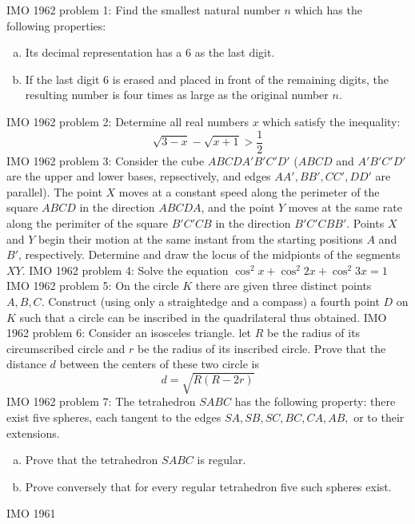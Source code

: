 IMO 1962 problem 1:  Find the smallest natural number $n$ which has the following properties:
\begin{enumerate}[a)]
  \item Its decimal representation has a 6 as the last digit.
  \item If the last digit 6 is erased and placed in front of the remaining digits, the resulting number is four times as large as the original number $n$.
\end{enumerate} 
IMO 1962 problem 2:  Determine all real numbers $x$ which satisfy the inequality:
\[ \sqrt{3-x}-\sqrt{x+1}>\dfrac{1}{2} \] 
IMO 1962 problem 3:  Consider the cube $ABCDA'B'C'D'$ ($ABCD$ and $A'B'C'D'$ are the upper and lower bases, repsectively, and edges $AA', BB', CC', DD'$ are parallel). The point $X$ moves at a constant speed along the perimeter of the square $ABCD$ in the direction $ABCDA$, and the point $Y$ moves at the same rate along the perimiter of the square $B'C'CB$ in the direction $B'C'CBB'$. Points $X$ and $Y$ begin their motion at the same instant from the starting positions $A$ and $B'$, respectively. Determine and draw the locus of the midpionts of the segments $XY$. 
IMO 1962 problem 4:  Solve the equation $\cos^2{x}+\cos^2{2x}+\cos^2{3x}=1$ 
IMO 1962 problem 5:  On the circle $K$ there are given three distinct points $A,B,C$. Construct (using only a straightedge and a compass) a fourth point $D$ on $K$ such that a circle can be inscribed in the quadrilateral thus obtained. 
IMO 1962 problem 6:  Consider an isosceles triangle. let $R$ be the radius of its circumscribed circle and $r$ be the radius of its inscribed circle. Prove that the distance $d$ between the centers of these two circle is
\[ d=\sqrt{R(R-2r)} \] 
IMO 1962 problem 7:  The tetrahedron $SABC$ has the following property: there exist five spheres, each tangent to the edges $SA, SB, SC, BC, CA, AB,$ or to their extensions.
\begin{enumerate}[a)]
  \item Prove that the tetrahedron $SABC$ is regular.
  \item Prove conversely that for every regular tetrahedron five such spheres exist.
\end{enumerate} 

IMO 1961 

